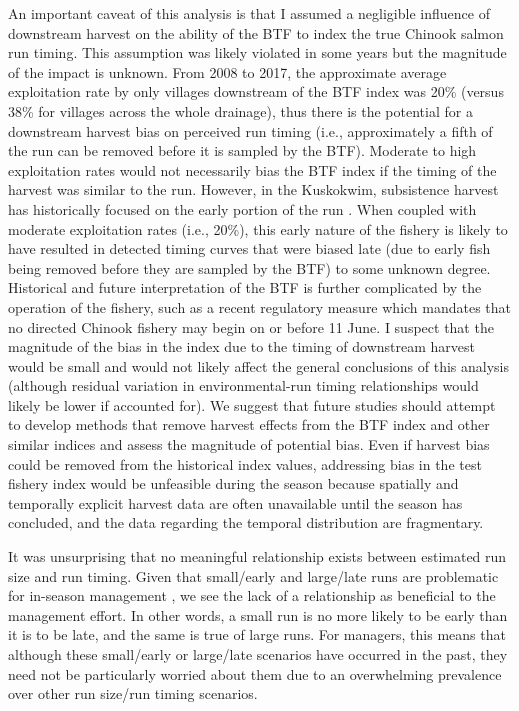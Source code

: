 \documentclass[12pt,]{book}
\theoremstyle{definition}
\theoremstyle{definition}
\theoremstyle{definition}
\theoremstyle{remark}
\begin{document}
An important caveat of this analysis is that I assumed a negligible
influence of downstream harvest on the ability of the BTF to index the
true Chinook salmon run timing. This assumption was likely violated in
some years but the magnitude of the impact is unknown. From 2008 to
2017, the approximate average exploitation rate by only villages
downstream of the BTF index was 20\% (versus 38\% for villages across
the whole drainage), thus there is the potential for a downstream
harvest bias on perceived run timing (i.e., approximately a fifth of the
run can be removed before it is sampled by the BTF). Moderate to high
exploitation rates would not necessarily bias the BTF index if the
timing of the harvest was similar to the run. However, in the Kuskokwim,
subsistence harvest has historically focused on the early portion of the
run \citep{hamazaki-2008}. When coupled with moderate exploitation rates
(i.e., 20\%), this early nature of the fishery is likely to have
resulted in detected timing curves that were biased late (due to early
fish being removed before they are sampled by the BTF) to some unknown
degree. Historical and future interpretation of the BTF is further
complicated by the operation of the fishery, such as a recent regulatory
measure which mandates that no directed Chinook fishery may begin on or
before 11 June. I suspect that the magnitude of the bias in the index
due to the timing of downstream harvest would be small and would not
likely affect the general conclusions of this analysis (although
residual variation in environmental-run timing relationships would
likely be lower if accounted for). We suggest that future studies should
attempt to develop methods that remove harvest effects from the BTF
index and other similar indices and assess the magnitude of potential
bias. Even if harvest bias could be removed from the historical index
values, addressing bias in the test fishery index would be unfeasible
during the season because spatially and temporally explicit harvest data
are often unavailable until the season has concluded, and the data
regarding the temporal distribution are fragmentary.

It was unsurprising that no meaningful relationship exists between
estimated run size and run timing. Given that small/early and large/late
runs are problematic for in-season management
\citep{adkison-cunningham-2015}, we see the lack of a relationship as
beneficial to the management effort. In other words, a small run is no
more likely to be early than it is to be late, and the same is true of
large runs. For managers, this means that although these small/early or
large/late scenarios have occurred in the past, they need not be
particularly worried about them due to an overwhelming prevalence over
other run size/run timing scenarios.
\end{document}
